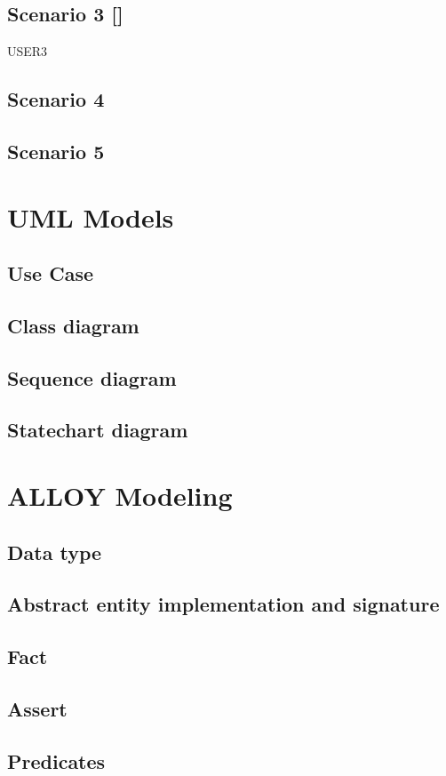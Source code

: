 \documentclass[18pt,oneside,a4paper, titlepage]{article}
\begin{document}
	\subsection{Scenario 3 []}
		USER3 
	\subsection{Scenario 4}
	\subsection{Scenario 5}

\newpage
\section{UML Models}
	\subsection{Use Case}
	\subsection{Class diagram}
	\subsection{Sequence diagram}
	\subsection{Statechart diagram}

\newpage
\section{ALLOY Modeling}
	\subsection{Data type}
	\subsection{Abstract entity implementation and signature}
	\subsection{Fact}
	\subsection{Assert}
	\subsection{Predicates}
\end{document}

